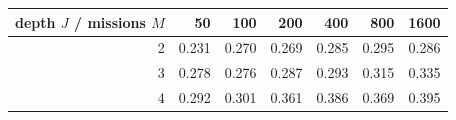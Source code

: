 \begin{tabular}{rrrrrrr}
\toprule
depth $J$ / missions $M$ & 50 & 100 & 200 & 400 & 800 & 1600 \\
\midrule
2 & 0.231 & 0.270 & 0.269 & 0.285 & 0.295 & 0.286 \\
3 & 0.278 & 0.276 & 0.287 & 0.293 & 0.315 & 0.335 \\
4 & 0.292 & 0.301 & 0.361 & 0.386 & 0.369 & 0.395 \\
\bottomrule
\end{tabular}